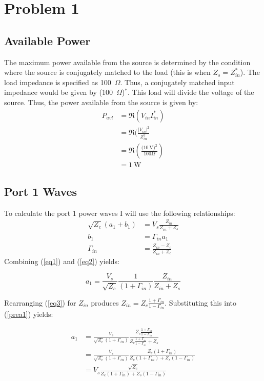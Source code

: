 \section*{Problem 1}
\addtocounter{section}{1}
\subsection{Available Power}
The maximum power available from the source is determined by the condition where
the source is conjugately matched to the load (this is when $Z_s = Z_{in}^*$).
The load impedance is specified as 100~$\Omega$. Thus, a conjugately matched
input impedance would be given by (100~$\Omega$)$^*$. This load will divide the
voltage of the source. Thus, the power available
from the source is given by:
\begin{align*}
    P_{avl} &= \Re(V_{in}I_{in}^*) \\
            &= \Re(\frac{|V_{in}|^2}{Z_{in}^2} \\
            &= \Re\left(\frac{(\SI{10}{\volt)^2}}{100 \Omega}\right) \\
            &= \SI{1}{\watt}
\end{align*}
\subsection{Port 1 Waves}
To calculate the port 1 power waves I will use the following 
relationships:
\begin{align}
    \sqrt{Z_c}\left( a_1 + b_1 \right) &= V_s \frac{Z_{in}}{Z_{in}+Z_s}
    \label{eq1} \\
    b_1 &= \Gamma_{in}a_1 \label{eq2} \\
    \Gamma_{in} &=\frac{Z_{in}-Z_c}{Z_{in}+Z_c} \label{eq3}
\end{align}
Combining (\ref{eq1}) and (\ref{eq2}) yields:

\begin{equation}
    a_1 = \frac{V_s}{\sqrt{Z_c}} \frac{1}{( 1+\Gamma_{in} )}
    \frac{Z_{in}}{Z_{in}+Z_s} \label{prea1}
\end{equation}

Rearranging (\ref{eq3}) for $Z_{in}$ produces $Z_{in} = Z_c
\frac{1+\Gamma_{ in }}{1-\Gamma_{ in }}$. Substituting this into (\ref{prea1}) yields:

\begin{align}
    a_1 &= \frac{V_s}{\sqrt{Z_c}( 1+\Gamma_{in} )} \frac{Z_c \frac{1+\Gamma_{ in }}{1-\Gamma_{
    in }}}{Z_c \frac{1+\Gamma_{ in }}{1-\Gamma_{ in }} + Z_s} \nonumber \\
    &= \frac{V_s}{\sqrt{Z_c}( 1+\Gamma_{in} )} \frac{Z_c \left( 1+\Gamma_{in}
    \right)}{Z_c \left( 1+ \Gamma_{in} \right) + Z_s \left( 1 - \Gamma_{in}
    \right)} \nonumber \\
    &= V_s \frac{\sqrt{Z_c}}{Z_c \left( 1+\Gamma_{in} \right) + Z_s \left( 1 -
\Gamma_{in} \right) } \label{a1}
\end{align}

